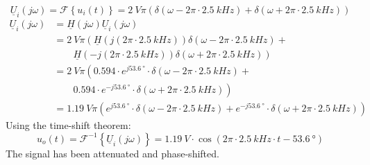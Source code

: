 \begin{solution}
\begin{tasks}
		\task
		\begin{equation*}
			\underline{U}_i\left(j \omega\right) = \mathcal{F}\left\{u_i(t)\right\} = \SI{2}{V} \pi \left(\delta\left(\omega - 2 \pi \cdot \SI{2.5}{kHz}\right) + \delta\left(\omega + 2 \pi \cdot \SI{2.5}{kHz}\right)\right)
		\end{equation*}
		\begin{equation*}
			\begin{split}
				\underline{U}_i\left(j \omega\right) &= \underline{H}\left(j \omega\right) \underline{U}_i\left(j \omega\right) \\
				 &= \SI{2}{V} \pi \left(\underline{H}\left(j \left(2 \pi \cdot \SI{2.5}{kHz}\right)\right) \delta\left(\omega - 2 \pi \cdot \SI{2.5}{kHz}\right) \right. + \\ &\qquad \left. \underline{H}\left(-j \left(2 \pi \cdot \SI{2.5}{kHz}\right)\right) \delta\left(\omega + 2 \pi \cdot \SI{2.5}{kHz}\right)\right) \\
				 &= \SI{2}{V} \pi \left(0.594 \cdot e^{j \SI{53.6}{\degree}} \cdot \delta\left(\omega - 2 \pi \cdot \SI{2.5}{kHz}\right) \right. + \\ &\qquad \left. 0.594 \cdot e^{-j \SI{53.6}{\degree}} \cdot \delta\left(\omega + 2 \pi \cdot \SI{2.5}{kHz}\right)\right) \\
				 &= \SI{1.19}{V} \pi \left(e^{j \SI{53.6}{\degree}} \cdot \delta\left(\omega - 2 \pi \cdot \SI{2.5}{kHz}\right) + e^{-j \SI{53.6}{\degree}} \cdot \delta\left(\omega + 2 \pi \cdot \SI{2.5}{kHz}\right)\right)
			\end{split}
		\end{equation*}
		Using the time-shift theorem:
		\begin{equation*}
			u_o(t) = \mathcal{F}^{-1}\left\{\underline{U}_i\left(j \omega\right)\right\} = \SI{1.19}{V} \cdot \cos\left(2 \pi \cdot \SI{2.5}{kHz} \cdot t - \SI{53.6}{\degree}\right)
		\end{equation*}
		The signal has been attenuated and phase-shifted.
		
	\end{tasks}
\end{solution}
